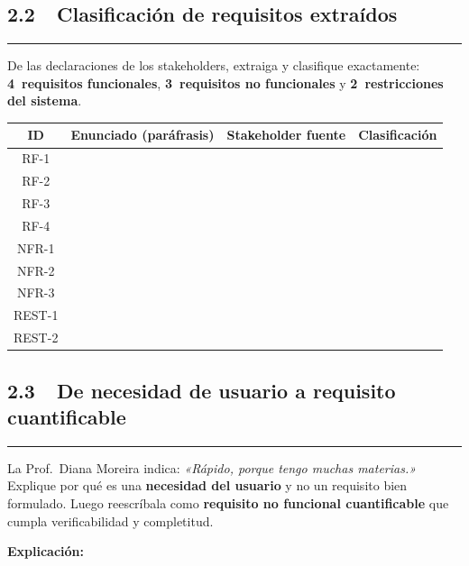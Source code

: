 \documentclass[11pt,a4paper]{article}
\newcommand{\pts}[1]{%
	\hfill\tikz[baseline=(X.base)]{%
		\node[fill=uteqgold,text=white,font=\small\bfseries,
		rounded corners=3pt,inner sep=3pt](X){#1};}}
\newcommand{\thdr}[1]{\cellcolor{darkgreen}\color{white}\bfseries #1}
\begin{document}
	\subsection*{2.2~~Clasificación de requisitos extraídos \pts{0.5 pts}}
	
	\noindent\rule{4pt}{12pt}\hspace{4pt}%
	De las declaraciones de los stakeholders, extraiga y clasifique
	exactamente: \textbf{4~requisitos funcionales}, \textbf{3~requisitos no
		funcionales} y \textbf{2~restricciones del sistema}.
	
	\vspace{6pt}
	\noindent
	{\small
		\begin{tabular}{|c|p{5.5cm}|p{2.8cm}|p{2cm}|}
			\hline
			\thdr{ID} &
			\thdr{Enunciado (paráfrasis)} &
			\thdr{Stakeholder fuente} &
			\thdr{Clasificación} \\
			\hline
			RF-1  & & & \\[0.6cm]\hline
			RF-2  & & & \\[0.6cm]\hline
			RF-3  & & & \\[0.6cm]\hline
			RF-4  & & & \\[0.6cm]\hline
			NFR-1 & & & \\[0.6cm]\hline
			NFR-2 & & & \\[0.6cm]\hline
			NFR-3 & & & \\[0.6cm]\hline
			REST-1 & & & \\[0.6cm]\hline
			REST-2 & & & \\[0.6cm]\hline
	\end{tabular}}
	
	\newpage
	\subsection*{2.3~~De necesidad de usuario a requisito cuantificable \pts{0.5 pts}}
	
	\noindent\rule{4pt}{12pt}\hspace{4pt}%
	La Prof.\ Diana Moreira indica: \textit{«Rápido, porque tengo muchas
		materias.»} Explique por qué es una \textbf{necesidad del usuario} y no
	un requisito bien formulado. Luego reescríbala como \textbf{requisito no
		funcional cuantificable} que cumpla verificabilidad y completitud.
	
	\vspace{6pt}
	\textbf{Explicación:}
	
\end{document}

